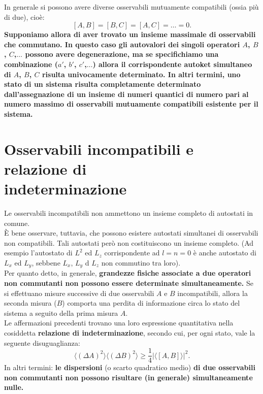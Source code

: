 \documentclass[a4paper,12pt,oneside]{book}
\begin{document}
In generale si possono avere diverse osservabili mutuamente compatibili (ossia più di due), cioè:
\begin{equation}
\left[A,B\right]=\left[B,C\right]=\left[A,C\right]=\dots =0.
\end{equation}
\textbf{Supponiamo allora di aver trovato un insieme massimale di osservabili che commutano. In questo caso gli autovalori dei singoli operatori $A$, $B$, $C$,$\dots$ possono avere degenerazione, ma se specifichiamo una combinazione ($a'$, $b'$, $c'$,$\dots$) allora il corrispondente autoket simultaneo di $A$, $B$, $C$ risulta univocamente determinato. In altri termini, uno stato di un sistema risulta completamente determinato dall'assegnazione di un insieme di numeri quantici di numero pari al numero massimo di osservabili mutuamente compatibili esistente per il sistema.}
\section[Osservabili incompatibili e relazione di indeterminazione]{Osservabili incompatibili e relazione di\\ indeterminazione}
Le osservabili incompatibili non ammettono un insieme completo di autostati in comune.\\
È bene osservare, tuttavia, che possono esistere autostati simultanei di osservabili non compatibili. Tali autostati però non costituiscono un insieme completo. (Ad esempio l'autostato di $L^2$ ed $L_z$ corrispondente ad $l=n=0$ è anche autostato di $L_x$ ed $L_y$, sebbene $L_x$, $L_y$ d $L_z$ non commutino tra loro).\\
Per quanto detto, in generale, \textbf{grandezze fisiche associate a due operatori non commutanti non possono essere determinate simultaneamente.} Se si effettuano misure successive di due osservabili $A$ e $B$ incompatibili, allora la seconda misura ($B$) comporta una perdita di informazione circa lo stato del sistema a seguito della prima misura $A$.\\
Le affermazioni precedenti trovano una loro espressione quantitativa nella cosiddetta \textbf{relazione di indeterminazione}, secondo cui, per ogni stato, vale la seguente disuguaglianza:
\begin{equation}
\label{eq:cap4_2}
\langle \left( \Delta A \right) ^2 \rangle \langle \left( \Delta B \right) ^2 \rangle \geq\frac{1}{4}\vert \langle \left[A,B \right] \rangle \vert ^2.
\end{equation}
In altri termini: \textbf{le dispersioni} (o scarto quadratico medio) \textbf{di due osservabili non commutanti non possono risultare (in generale) simultaneamente nulle.}
\end{document}
